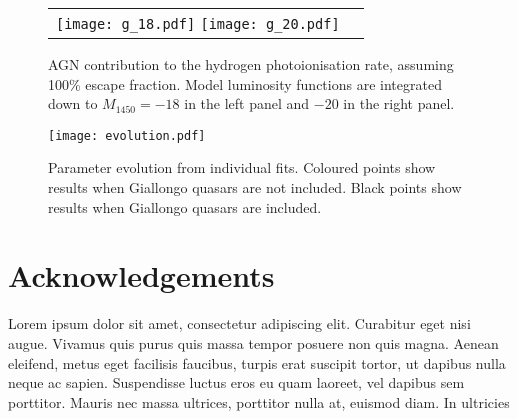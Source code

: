 \documentclass[a4paper,fleqn,usenatbib]{mnras}
\begin{document}
\begin{figure*}
  \begin{center}
    \begin{tabular}{cc}
    \texttt{[image: g\_18.pdf]}
    \texttt{[image: g\_20.pdf]}
    \end{tabular}
  \end{center}
  \caption{AGN contribution to the hydrogen photoionisation rate,
    assuming 100\% escape fraction.  Model luminosity functions are
    integrated down to $M_{1450}=-18$ in the left panel and $-20$ in
    the right panel.}
  \label{fig:gammapi}
\end{figure*}

\begin{figure*}
  \begin{center}
    \texttt{[image: evolution.pdf]}
  \end{center}
  \caption{Parameter evolution from individual fits.  Coloured points
    show results when Giallongo quasars are not included.  Black
    points show results when Giallongo quasars are included.}
\end{figure*}

\section*{Acknowledgements}

Lorem ipsum dolor sit amet, consectetur adipiscing elit. Curabitur
eget nisi augue. Vivamus quis purus quis massa tempor posuere non quis
magna. Aenean eleifend, metus eget facilisis faucibus, turpis erat
suscipit tortor, ut dapibus nulla neque ac sapien. Suspendisse luctus
eros eu quam laoreet, vel dapibus sem porttitor. Mauris nec massa
ultrices, porttitor nulla at, euismod diam. In ultricies




\bsp
\label{lastpage}
\end{document}
